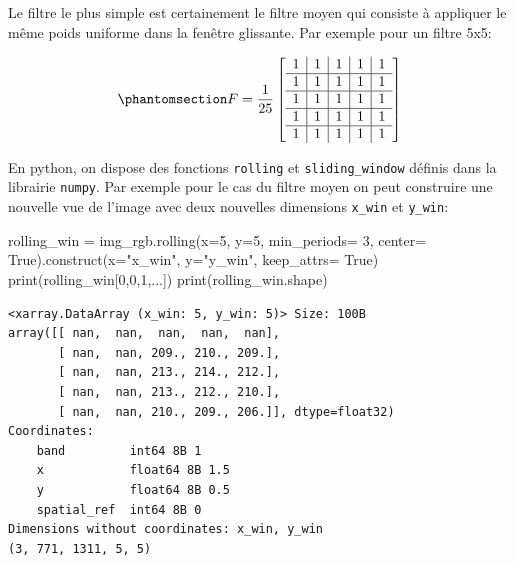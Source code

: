 \documentclass[
  11pt,
  letterpaper,
  open=any,
  twoside=false,
  french]{scrbook}
\newenvironment{Shaded}{\begin{snugshade}}{\end{snugshade}}
\newcommand{\BuiltInTok}[1]{\textcolor[rgb]{0.00,0.23,0.31}{#1}}
\newcommand{\DecValTok}[1]{\textcolor[rgb]{0.68,0.00,0.00}{#1}}
\newcommand{\NormalTok}[1]{\textcolor[rgb]{0.00,0.23,0.31}{#1}}
\newcommand{\OperatorTok}[1]{\textcolor[rgb]{0.37,0.37,0.37}{#1}}
\newcommand{\StringTok}[1]{\textcolor[rgb]{0.13,0.47,0.30}{#1}}
\newcommand{\VariableTok}[1]{\textcolor[rgb]{0.07,0.07,0.07}{#1}}
\begin{document}
Le filtre le plus simple est certainement le filtre moyen qui consiste à
appliquer le même poids uniforme dans la fenêtre glissante. Par exemple
pour un filtre 5x5:

\begin{equation}\phantomsection\label{eq-boxfilter}{
F= \frac{1}{25}\left[
\begin{array}{c|c|c|c|c}
1 & 1 & 1 & 1 & 1 \\
\hline
1 & 1 & 1 & 1 & 1 \\
\hline
1 & 1 & 1 & 1 & 1 \\
\hline
1 & 1 & 1 & 1 & 1 \\
\hline
1 & 1 & 1 & 1 & 1
\end{array}
\right]
}\end{equation}

En python, on dispose des fonctions \texttt{rolling} et
\texttt{sliding\_window} définis dans la librairie \texttt{numpy}. Par
exemple pour le cas du filtre moyen on peut construire une nouvelle vue
de l'image avec deux nouvelles dimensions \texttt{x\_win} et
\texttt{y\_win}:

\begin{Shaded}
\begin{Highlighting}[]
\NormalTok{rolling\_win }\OperatorTok{=}\NormalTok{ img\_rgb.rolling(x}\OperatorTok{=}\DecValTok{5}\NormalTok{, y}\OperatorTok{=}\DecValTok{5}\NormalTok{,  min\_periods}\OperatorTok{=} \DecValTok{3}\NormalTok{, center}\OperatorTok{=} \VariableTok{True}\NormalTok{).construct(x}\OperatorTok{=}\StringTok{"x\_win"}\NormalTok{, y}\OperatorTok{=}\StringTok{"y\_win"}\NormalTok{, keep\_attrs}\OperatorTok{=} \VariableTok{True}\NormalTok{)}
\BuiltInTok{print}\NormalTok{(rolling\_win[}\DecValTok{0}\NormalTok{,}\DecValTok{0}\NormalTok{,}\DecValTok{1}\NormalTok{,...])}
\BuiltInTok{print}\NormalTok{(rolling\_win.shape)}
\end{Highlighting}
\end{Shaded}

\begin{verbatim}
<xarray.DataArray (x_win: 5, y_win: 5)> Size: 100B
array([[ nan,  nan,  nan,  nan,  nan],
       [ nan,  nan, 209., 210., 209.],
       [ nan,  nan, 213., 214., 212.],
       [ nan,  nan, 213., 212., 210.],
       [ nan,  nan, 210., 209., 206.]], dtype=float32)
Coordinates:
    band         int64 8B 1
    x            float64 8B 1.5
    y            float64 8B 0.5
    spatial_ref  int64 8B 0
Dimensions without coordinates: x_win, y_win
(3, 771, 1311, 5, 5)
\end{verbatim}
\end{document}
